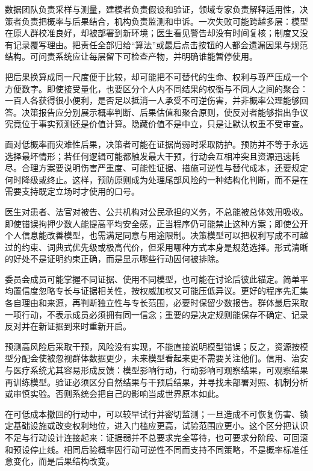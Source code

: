 数据团队负责采样与测量，建模者负责假设和验证，领域专家负责解释适用性，决策者负责把概率与后果结合，机构负责监测和申诉。一次失败可能跨越多层：模型在原人群校准良好，却被部署到新环境；医生看见警告却没有时间复核；制度又没有记录覆写理由。把责任全部归给“算法”或最后点击按钮的人都会遗漏因果与规范结构。可问责系统应让每层留下可检查产物，并明确谁能暂停使用。

把后果换算成同一尺度便于比较，却可能把不可替代的生命、权利与尊严压成一个方便数字。即使接受量化，也要区分个人内不同结果的权衡与不同人之间的聚合：一百人各获得很小便利，是否足以抵消一人承受不可逆伤害，并非概率公理能够回答。决策报告应分别展示概率判断、后果估值和聚合原则，使反对者能够指出争议究竟位于事实预测还是价值计算。隐藏价值不是中立，只是让默认权重不受审查。

面对低概率而灾难性后果，决策者可能在证据尚弱时采取防护。预防并不等于永远选择最坏情形；若任何逻辑可能都触发最大干预，行动会互相冲突且资源迅速耗尽。合理方案要说明伤害严重度、可能性证据、措施可逆性与替代成本，还要规定何时降级或终止。这样，预防原则成为处理尾部风险的一种结构化判断，而不是在需要支持既定立场时才使用的口号。

医生对患者、法官对被告、公共机构对公民承担的义务，不总能被总体效用吸收。即使错误拘押少数人能提高平均安全感，正当程序仍可能禁止这种方案；即使公开个人信息能改善模型，也需满足同意与用途限制。决策模型可以把权利写成不可越过的约束、词典式优先级或极高代价，但采用哪种方式本身是规范选择。形式清晰的好处不是证明约束正确，而是显示哪些行动因何被排除。

委员会成员可能掌握不同证据、使用不同模型，也可能在讨论后彼此锚定。简单平均置信度忽略专长与证据相关性，按权威加权又可能压低异议。更好的程序先汇集各自理由和来源，再判断独立性与专长范围，必要时保留少数报告。群体最后采取一项行动，不表示成员必须拥有同一信念；重要的是决定规则能保存不确定、记录反对并在新证据到来时重新开启。

预测高风险后采取干预，风险没有实现，不能直接说明模型错误；反之，资源按模型分配会使被忽视群体数据更少，未来模型看起来更不需要关注他们。信用、治安与医疗系统尤其容易形成反馈：模型影响行动，行动影响可观察结果，可观察结果再训练模型。验证必须区分自然结果与干预后结果，并寻找未部署对照、机制分析或审慎实验。否则系统会把自己的影响当成世界原本如此。

在可低成本撤回的行动中，可以较早试行并密切监测；一旦造成不可恢复伤害、锁定基础设施或改变权利地位，进入门槛应更高，试验范围应更小。这个区分把认识不足与行动设计连接起来：证据弱并不总要求完全等待，也可要求分阶段、可回滚和预设停止线。相同后验概率因行动可逆性不同而支持不同策略，不是概率标准任意变化，而是后果结构改变。


